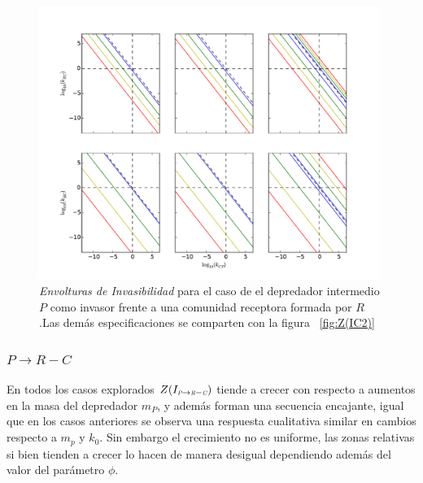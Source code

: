 \begin{figure}
  \centering
  \includegraphics[width = 0.99\textwidth]{./Plots/Z(IC3)AcGrGr.pdf}
  \caption[Env $Z(IC2)$]{\emph{Envolturas de Invasibilidad} para el caso de el depredador intermedio $P$ como invasor frente a una comunidad receptora formada por $R$.Las dem\'as especificaciones se comparten con la figura ~\ref{fig:Z(IC2)}}
  \label{fig:Z(IC3)}
\end{figure}


\subsubsection{$ P \to R-C$}

En todos los casos explorados $Z(I_{\textit{\tiny P} \to \textit{\tiny R} - \textit{\tiny C}})$ tiende a crecer con respecto a aumentos en la masa del depredador $m_P$, y adem\'as forman una secuencia encajante, igual que en los casos anteriores se observa una respuesta cualitativa similar en cambios respecto a $m_p$ y $k_0$. Sin embargo el crecimiento no es uniforme, las zonas relativas si bien tienden a crecer lo hacen de manera desigual dependiendo adem\'as del valor del par\'ametro $\phi$.\\

